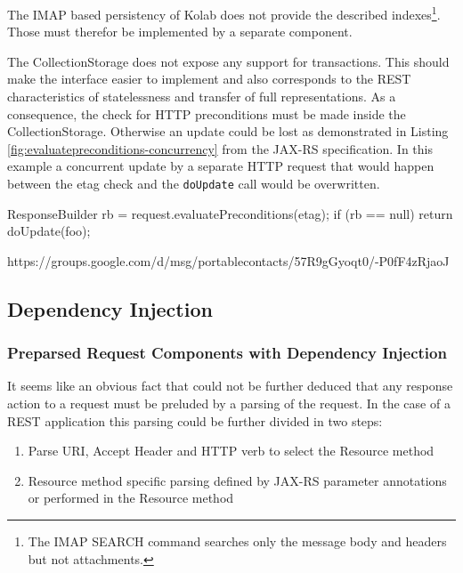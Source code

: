 \documentclass[11pt,a4paper,headsepline,twoside]{scrartcl}		%
\begin{document}
The IMAP based persistency of Kolab does not provide the described
indexes\footnote{The IMAP SEARCH command\cite[sec 6.4.4]{RFC3501} searches only
  the message body and headers but not attachments.}. Those must therefor be
implemented by a separate component.

The CollectionStorage does not expose any support for transactions. This should
make the interface easier to implement and also corresponds to the REST
characteristics of statelessness and transfer of full representations. As a
consequence, the check for HTTP preconditions must be made inside the
CollectionStorage. Otherwise an update could be lost as demonstrated in Listing
\ref{fig:evaluatepreconditions-concurrency} from the JAX-RS
specification\cite[p. 28]{JAX-RS1.1}. In this example a concurrent update by a
separate HTTP request that would happen between the etag check and the
\lstinline:doUpdate: call would be overwritten.

\begin{javalisting}[label=fig:evaluatepreconditions-concurrency,
                   float=htb,
                   caption={Potential lost-update problem with JAX-RS}]
ResponseBuilder rb = request.evaluatePreconditions(etag);
if (rb == null) return doUpdate(foo);
\end{javalisting}



%
https://groups.google.com/d/msg/portablecontacts/57R9gGyoqt0/-P0fF4zRjaoJ

\subsection{Dependency Injection}
\label{sec:dependency-injection}


\subsubsection{Preparsed Request Components with Dependency Injection}
\label{sec:prep-requ-comp}

It seems like an obvious fact that could not be further deduced that any
response action to a request must be preluded by a parsing of the request. In
the case of a REST application this parsing could be further divided in two
steps:
\begin{enumerate}
\item Parse URI, Accept Header and HTTP verb to select the Resource method
\item Resource method specific parsing defined by JAX-RS parameter annotations
  or performed in the Resource method
\end{enumerate}
\end{document}
